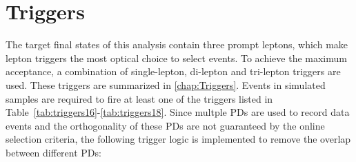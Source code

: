 \begin{table}
\sffamily
\caption{Summary of the configurations of the \ac{MC} samples. DYM50 (DYM10to50) denote DY sample with a dilepton invariant mass greater than 50 GeV (between 10 and 50 GeV). V includes W and Z bosons. The cross sections for samples without a citation are taken from samples themselves.}
\centering
  \label{tab:MCsample}
 \end{table} 
\section{Triggers}
\label{sec:Triggers}

The target final states of this analysis contain three prompt leptons, which make lepton triggers the most optical choice to select events. To achieve the maximum acceptance, a combination of single-lepton, di-lepton and tri-lepton triggers are used. These triggers are summarized in \autoref{chap:Triggers}. Events in simulated samples are required to fire at least one of the triggers listed in Table~\ref{tab:triggers16}-\ref{tab:triggers18}. Since multple \acp{PD} are used to record data events and the orthogonality of these \acp{PD} are not guaranteed by the online selection criteria, the following trigger logic is implemented to remove the overlap between different \acp{PD}:

